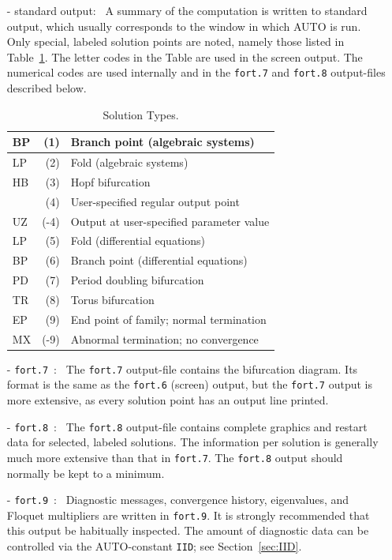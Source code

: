 \documentclass[12pt]{report}
\begin{document}
\begin{itemize}
\item[-] standard output:~
  A summary of the computation is written to standard output, which usually
  corresponds to the window in which {\cal AUTO} is run. 
  Only special, labeled solution points are noted, namely those listed
  in Table~\ref{tbl:Solution_Types}.
  The letter codes in the Table are used in the screen output.
  The numerical codes are used internally and in
  the {\tt fort.7} and {\tt fort.8} output-files described below.

\begin{table}[htbp]
\begin{center}
\begin{tabular}{| l | r | l |}
\hline
 BP & (1)  & Branch point (algebraic systems) \\
\hline
 LP & (2)  & Fold (algebraic systems) \\
\hline
 HB & (3)  & Hopf bifurcation \\
\hline
  & (4)  & User-specified regular output point \\
\hline
 UZ & (-4)  & Output at user-specified parameter value \\
\hline
 LP & (5)  & Fold (differential equations) \\
\hline
 BP & (6)  & Branch point (differential equations) \\
\hline
 PD & (7)  & Period doubling bifurcation \\
\hline
 TR & (8)  & Torus bifurcation \\
\hline
 EP & (9)  & End point of family; normal termination \\
\hline
 MX & (-9)  & Abnormal termination; no convergence \\
\hline
\end{tabular}
\caption{Solution Types.}
\label{tbl:Solution_Types}
\end{center}
\end{table}
 

\item[-] {\tt fort.7}~:~ 
  The {\tt fort.7} output-file contains the bifurcation diagram.
  Its format is the same as the {\tt fort.6} (screen) output, 
  but the {\tt fort.7} output is more extensive, as every solution point has 
  an output line printed.
\item[-] {\tt fort.8}~:~ 
  The {\tt fort.8} output-file contains complete graphics and restart data
  for selected, labeled solutions. 
  The information per solution is generally much more extensive than
  that in {\tt fort.7}. 
  The {\tt fort.8} output should normally be kept to a minimum.
\item[-] {\tt fort.9}~:~
  Diagnostic messages, convergence history, eigenvalues, and 
  Floquet multipliers are written in {\tt fort.9}.
  It is strongly recommended that this output be habitually inspected.
  The amount of diagnostic data can be controlled via the {\cal AUTO}-constant {\tt IID};
  see Section~\ref{sec:IID}.
\end{itemize}
\end{document}
